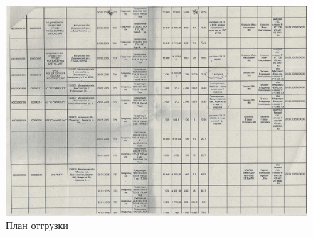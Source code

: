 




\begin{figure}
\begin{center}
 \includegraphics[height=0.5\textheight, angle=90, keepaspectratio]{Pics/X.2.jpg}
\end{center}
 \caption{План отгрузки}
 \label{pic:X.2}
\end{figure}

